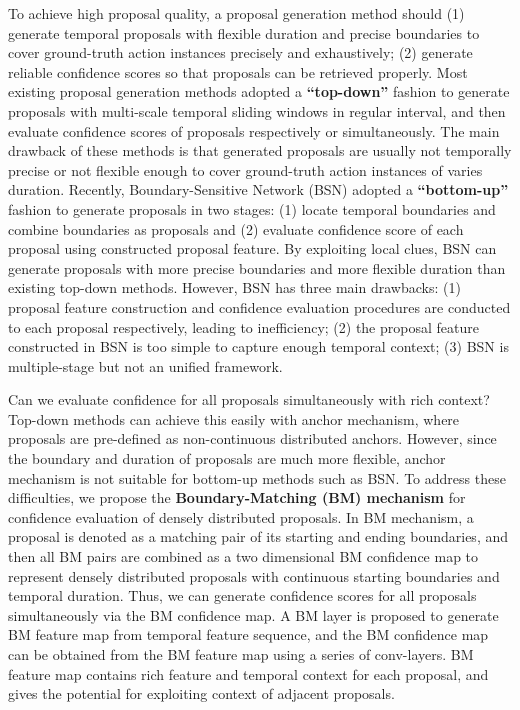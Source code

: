 \documentclass[10pt,twocolumn,letterpaper]{article}
\begin{document}
To achieve high proposal quality, a proposal generation method should (1) generate temporal proposals with flexible duration and precise boundaries to cover ground-truth action instances precisely and exhaustively; (2) generate reliable confidence scores so that proposals can be retrieved properly.
Most existing proposal generation methods \cite{sst_buch_cvpr17,fast_temporal_activity_cvpr16,escorcia2016daps,shou2016action} adopted a \textbf{``top-down''} fashion to generate proposals with multi-scale temporal sliding windows in regular interval, and then evaluate confidence scores of proposals respectively or simultaneously.
The main drawback of these methods is that generated proposals are usually not temporally precise or not flexible enough to cover  ground-truth action instances of varies duration.
Recently, Boundary-Sensitive Network (BSN) \cite{lin2018bsn} adopted a \textbf{``bottom-up''} fashion to generate proposals in two stages:  (1) locate temporal boundaries and combine boundaries as proposals and (2) evaluate confidence score of each proposal using constructed proposal feature. 
By exploiting local clues, BSN can generate proposals with  more precise boundaries and more  flexible duration than existing top-down methods.
However, BSN has three main drawbacks: (1) proposal feature construction and confidence evaluation procedures are conducted to each proposal respectively, leading to inefficiency;
(2) the proposal feature constructed in BSN is too simple to capture enough temporal context;
(3) BSN is multiple-stage but not an unified framework.


Can we evaluate confidence for all proposals simultaneously with rich context?
Top-down methods \cite{ssad,sstad} can achieve this easily with anchor mechanism, where proposals are pre-defined as non-continuous distributed anchors.
However, since the boundary and duration of proposals are much more flexible, anchor mechanism is not suitable for bottom-up methods such as BSN. 
To address these difficulties, we propose the \textbf{Boundary-Matching (BM) mechanism} for  confidence evaluation of densely distributed proposals. In BM mechanism, a proposal is denoted as a matching pair of its starting and ending boundaries, and then all BM pairs are combined  as a two dimensional BM confidence map to represent densely distributed proposals with continuous starting boundaries and temporal duration.
Thus, we can generate confidence scores for all proposals simultaneously via the BM confidence map.
A BM layer is proposed to generate BM feature map from temporal feature sequence, and the BM confidence map can be obtained from the BM feature map using a series of conv-layers. BM feature map contains rich feature and temporal context for each proposal, and gives the potential for exploiting context of adjacent proposals.
\end{document}
